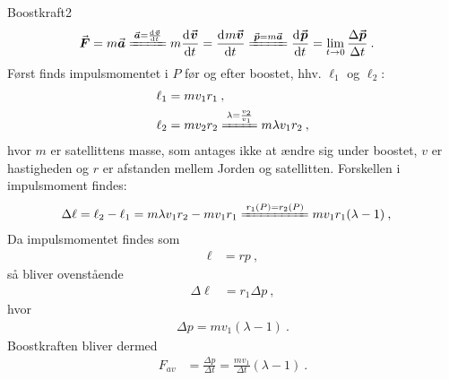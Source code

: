 \begin{opgave}{Boostkraft}{2}
\opg \begin{align*}
	\v{F} &= m\v{a}
	\xleq{\v{a} = \dif{t}{\v{v}}}
	m \dif{t}{\v{v}}
	= \dif{t}{m\v{v}}
	\xleq{\v{p} = m\v{a}}
	\dif{t}{\v{p}}
	= \lim\limits_{t \rightarrow 0} \frac{\Delta \v{p}}{\Delta t} \: .
\end{align*}
\opg Først finds impulsmomentet i $P$ før og efter boostet, hhv. $\ell_1$ og $\ell_2$:
\begin{align*}
	\ell_1 &= mv_1r_1 \: , \\
	\ell_2 &= mv_2r_2
	\xleq{\lambda = \frac{v_2}{v_1}}
	m \lambda v_1 r_2 \: ,
\end{align*}
hvor $m$ er satellittens masse, som antages ikke at ændre sig under boostet, $v$ er hastigheden og $r$ er afstanden mellem Jorden og satellitten.
Forskellen i impulsmoment findes:
\begin{align*}
	\Delta \ell &= \ell_2 - \ell_1
	= m \lambda v_1 r_2 - mv_1r_1
	\xleq{r_1(P) = r_2(P)}
	mv_1r_1(\lambda - 1) \: ,
\end{align*}
Da impulsmomentet findes som
\begin{align*}
	\ell &= rp \: ,
\end{align*}
så bliver ovenstående
\begin{align*}
	\Delta \ell &= r_1 \Delta p \: ,
\end{align*}
hvor
\begin{align*}
	\Delta p = mv_1(\lambda-1) \: .
\end{align*}
Boostkraften bliver dermed
\begin{align*}
	F_{av} &= \frac{\Delta p}{\Delta t}
	= \frac{mv_1}{\Delta t} (\lambda-1) \: .
\end{align*}
\end{opgave}
%
%
